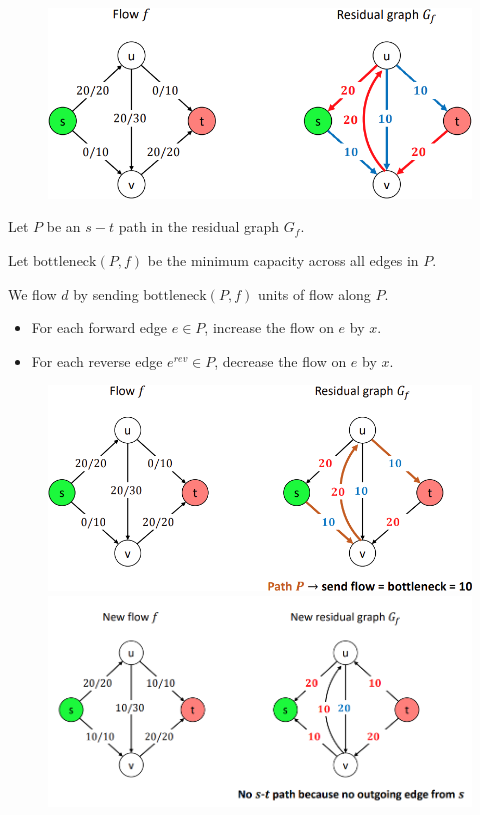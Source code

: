 \begin{figure}[ht!]
    \centering
    \includegraphics[width=0.63\linewidth]{figures/residual-graph.png}
\end{figure}

\begin{definition}\label{def:augmenting-path}
    Let $P$ be an $s-t$ path in the residual graph $G_f$. 

    Let $\text{bottleneck}(P, f)$ be the minimum capacity across all edges in $P$. 

    We  flow $d$ by sending $\text{bottleneck}(P, f)$ units of flow along $P$. 

    \begin{itemize}
        \item For each forward edge $e \in P$, increase the flow on $e$ by $x$. 
        \item For each reverse edge $e^{rev} \in P$, decrease the flow on $e$ by $x$. 
    \end{itemize}
\end{definition}

\begin{figure}[ht!]
    \centering
    \includegraphics[width=0.65\linewidth]{figures/augmenting-path-1.png}
    \includegraphics[width=0.65\linewidth]{figures/augmenting-path-2.png}
\end{figure}

